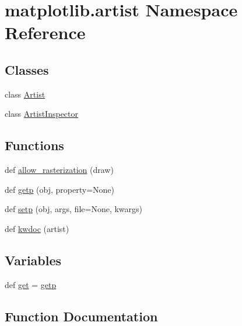 \hypertarget{namespacematplotlib_1_1artist}{}\section{matplotlib.\+artist Namespace Reference}
\label{namespacematplotlib_1_1artist}
\subsection*{Classes}
\begin{DoxyCompactItemize}
\item 
class \hyperlink{classmatplotlib_1_1artist_1_1Artist}{Artist}
\item 
class \hyperlink{classmatplotlib_1_1artist_1_1ArtistInspector}{Artist\+Inspector}
\end{DoxyCompactItemize}
\subsection*{Functions}
\begin{DoxyCompactItemize}
\item 
def \hyperlink{namespacematplotlib_1_1artist_a245255cfcc105c1845ef73ae27e6dabf}{allow\+\_\+rasterization} (draw)
\item 
def \hyperlink{namespacematplotlib_1_1artist_a785d2dbc5e400ed2895a0402aa5a033b}{getp} (obj, property=None)
\item 
def \hyperlink{namespacematplotlib_1_1artist_a9ff399f3e188b91146776186bc5e58d0}{setp} (obj, args, file=None, kwargs)
\item 
def \hyperlink{namespacematplotlib_1_1artist_a77bfe0d444aada684df5406441f82753}{kwdoc} (artist)
\end{DoxyCompactItemize}
\subsection*{Variables}
\begin{DoxyCompactItemize}
\item 
def \hyperlink{namespacematplotlib_1_1artist_ae96fe45bfe7ec8859299a9de210c0dca}{get} = \hyperlink{namespacematplotlib_1_1artist_a785d2dbc5e400ed2895a0402aa5a033b}{getp}
\end{DoxyCompactItemize}


\subsection{Function Documentation}
\mbox{\label{namespacematplotlib_1_1artist_a245255cfcc105c1845ef73ae27e6dabf}} 
